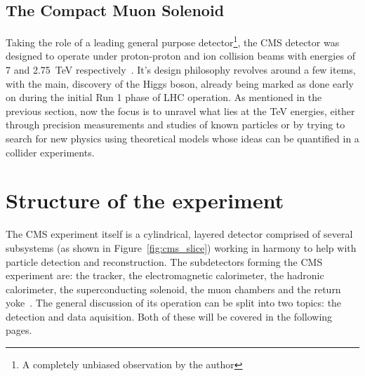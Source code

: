 \subsection{The Compact Muon Solenoid}
\hspace{10pt} Taking the role of a leading general purpose detector\footnote{A completely unbiased observation by the author}, the CMS detector was designed to operate under proton-proton and ion collision beams with energies of 7 and 2.75~TeV respectively~\cite{cms:tdr}. It's design philosophy revolves around a few items, with the main, discovery of the Higgs boson, already  being marked as done early on during the initial Run 1 phase of LHC operation. As mentioned in the previous section, now the focus is to unravel what lies at the TeV energies, either through precision measurements and studies of known particles or by trying to search for new physics using theoretical models whose ideas can be quantified in a collider experiments. 



\section{Structure of the experiment}

\hspace{10pt}The CMS experiment itself is a cylindrical, layered detector comprised of several subsystems (as shown in Figure~\ref{fig:cms_slice}) working in harmony to help with particle detection and reconstruction. The subdetectors forming the CMS experiment are: the tracker, the electromagnetic calorimeter, the hadronic calorimeter, the superconducting solenoid, the muon chambers and the return yoke~\cite{cms:paper}. The general discussion of its operation can be split into two topics: the detection and data aquisition. Both of these will be covered in the following pages.
